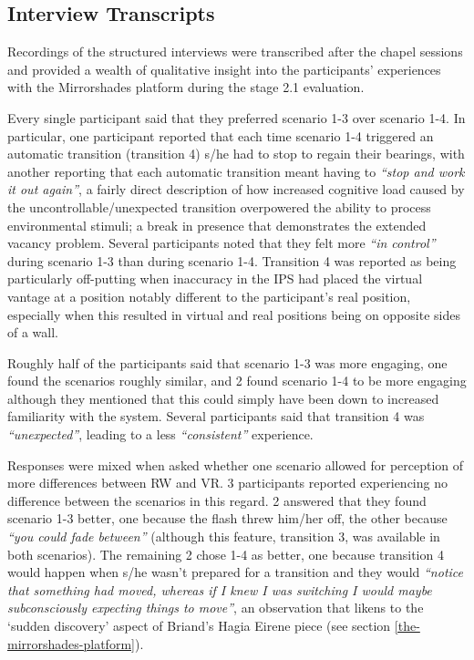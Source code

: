 
\subsection{Interview Transcripts}

Recordings of the structured interviews were transcribed after the chapel sessions and provided a wealth of qualitative insight into the participants' experiences with the Mirrorshades platform during the stage 2.1 evaluation.

Every single participant said that they preferred scenario 1-3 over scenario 1-4. In particular, one participant  reported that each time scenario 1-4 triggered an automatic transition (transition 4) s/he had to stop to regain their bearings, with another reporting that each automatic transition meant having to \textit{``stop and work it out again''}, a fairly direct description of how increased cognitive load caused by the uncontrollable/unexpected transition overpowered the ability to process environmental stimuli; a break in presence that demonstrates the extended vacancy problem. Several participants noted that they felt more \textit{``in control''} during scenario 1-3 than during scenario 1-4. Transition 4 was reported as being particularly off-putting when inaccuracy in the IPS had placed the virtual vantage at a position notably different to the participant's real position, especially when this resulted in virtual and real positions being on opposite sides of a wall.

Roughly half of the participants said that scenario 1-3 was more engaging, one found the scenarios roughly similar, and 2 found scenario 1-4 to be more engaging although they mentioned that this could simply have been down to increased familiarity with the system. Several participants said that transition 4 was \textit{``unexpected''}, leading to a less \textit{``consistent''} experience.

Responses were mixed when asked whether one scenario allowed for perception of more differences between RW and VR. 3 participants reported experiencing no difference between the scenarios in this regard. 2 answered that they found scenario 1-3 better, one because the flash threw him/her off, the other because \textit{``you could fade between''}  (although this feature, transition 3, was available in both scenarios). The remaining 2 chose 1-4 as better, one because transition 4 would happen when s/he wasn't prepared for a transition and they would \textit{``notice that something had moved, whereas if I knew I was switching I would maybe subconsciously expecting things to move''}, an observation that likens to the `sudden discovery' aspect of Briand's Hagia Eirene piece (see section \ref{the-mirrorshades-platform}).


